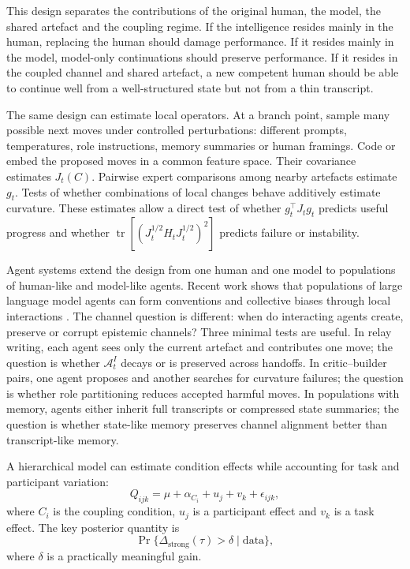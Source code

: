 \documentclass[11pt]{article}
\newcommand{\tr}{\operatorname{tr}}
\newcommand{\Aint}{\mathcal{A}^{I}}
\newcommand{\DeltaStrong}{\Delta_{\mathrm{strong}}}
\begin{document}
This design separates the contributions of the original human, the model, the shared artefact and the coupling regime. If the intelligence resides mainly in the human, replacing the human should damage performance. If it resides mainly in the model, model-only continuations should preserve performance. If it resides in the coupled channel and shared artefact, a new competent human should be able to continue well from a well-structured state but not from a thin transcript.

The same design can estimate local operators. At a branch point, sample many possible next moves under controlled perturbations: different prompts, temperatures, role instructions, memory summaries or human framings. Code or embed the proposed moves in a common feature space. Their covariance estimates $J_t(C)$. Pairwise expert comparisons among nearby artefacts estimate $g_t$. Tests of whether combinations of local changes behave additively estimate curvature. These estimates allow a direct test of whether $g_t^\top J_tg_t$ predicts useful progress and whether $\tr[(J_t^{1/2}H_tJ_t^{1/2})^2]$ predicts failure or instability.

Agent systems extend the design from one human and one model to populations of human-like and model-like agents. Recent work shows that populations of large language model agents can form conventions and collective biases through local interactions \cite{Ashery2025}. The channel question is different: when do interacting agents create, preserve or corrupt epistemic channels? Three minimal tests are useful. In relay writing, each agent sees only the current artefact and contributes one move; the question is whether $\Aint_t$ decays or is preserved across handoffs. In critic--builder pairs, one agent proposes and another searches for curvature failures; the question is whether role partitioning reduces accepted harmful moves. In populations with memory, agents either inherit full transcripts or compressed state summaries; the question is whether state-like memory preserves channel alignment better than transcript-like memory.

A hierarchical model can estimate condition effects while accounting for task and participant variation:
\begin{equation}
    Q_{ijk} = \mu + \alpha_{C_i} + u_j + v_k + \epsilon_{ijk},
\end{equation}
where $C_i$ is the coupling condition, $u_j$ is a participant effect and $v_k$ is a task effect. The key posterior quantity is
\begin{equation}
    \Pr\{\DeltaStrong(\tau)>\delta \mid \text{data}\},
\end{equation}
where $\delta$ is a practically meaningful gain.
\end{document}
